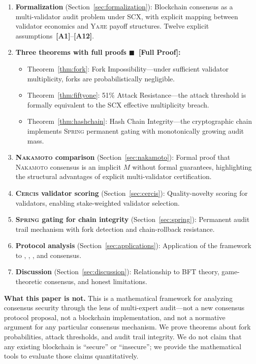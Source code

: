 \documentclass[11pt,a4paper]{article}
\theoremstyle{definition}
\newcommand{\rigorFull}[0]{$\blacksquare$~\textbf{[Full Proof]}}
\newcommand{\Yajie}{\textsc{Yajie}}
\newcommand{\Spring}{\textsc{Spring}}
\newcommand{\Cercis}{\textsc{Cercis}}
\newcommand{\SCX}{\textsc{SCX}}
\newcommand{\Nakamoto}{\textsc{Nakamoto}}
\newcommand{\PoW}{\mathrm{PoW}}
\newcommand{\PoS}{\mathrm{PoS}}
\newcommand{\PBFT}{\mathrm{PBFT}}
\newcommand{\Tendermint}{\mathrm{Tendermint}}
\newcommand{\assumptionTag}[1]{\textsf{\textbf{[A#1]}}}
\begin{document}
\begin{enumerate}[label=(\roman*)]
    \item \textbf{Formalization} (Section~\ref{sec:formalization}): Blockchain consensus as a multi-validator audit problem under \SCX{}, with explicit mapping between validator economics and \Yajie{} payoff structures. Twelve explicit assumptions~\assumptionTag{1}--\assumptionTag{12}.
    \item \textbf{Three theorems with full proofs \rigorFull:}
    \begin{itemize}
        \item Theorem~\ref{thm:fork}: Fork Impossibility—under sufficient validator multiplicity, forks are probabilistically negligible.
        \item Theorem~\ref{thm:fiftyone}: 51\% Attack Resistance—the attack threshold is formally equivalent to the \SCX{} effective multiplicity breach.
        \item Theorem~\ref{thm:hashchain}: Hash Chain Integrity—the cryptographic chain implements \Spring{} permanent gating with monotonically growing audit mass.
    \end{itemize}
    \item \textbf{\Nakamoto{} comparison} (Section~\ref{sec:nakamoto}): Formal proof that \Nakamoto{} consensus is an implicit $M$ without formal guarantees, highlighting the structural advantages of explicit multi-validator certification.
    \item \textbf{\Cercis{} validator scoring} (Section~\ref{sec:cercis}): Quality-novelty scoring for validators, enabling stake-weighted validator selection.
    \item \textbf{\Spring{} gating for chain integrity} (Section~\ref{sec:spring}): Permanent audit trail mechanism with fork detection and chain-rollback resistance.
    \item \textbf{Protocol analysis} (Section~\ref{sec:applications}): Application of the framework to \PoW{}, \PoS{}, \PBFT{}, and \Tendermint{} consensus.
    \item \textbf{Discussion} (Section~\ref{sec:discussion}): Relationship to BFT theory, game-theoretic consensus, and honest limitations.
\end{enumerate}
\textbf{What this paper is not.} This is a mathematical framework for analyzing consensus security through the lens of multi-expert audit—not a new consensus protocol proposal, not a blockchain implementation, and not a normative argument for any particular consensus mechanism. We prove theorems about fork probabilities, attack thresholds, and audit trail integrity. We do not claim that any existing blockchain is ``secure'' or ``insecure''; we provide the mathematical tools to evaluate those claims quantitatively.
\end{document}
